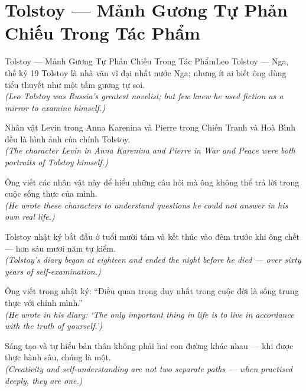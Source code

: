 \section{Tolstoy --- Mảnh Gương Tự Phản Chiếu Trong Tác Phẩm}
\begin{truyen}{Tolstoy --- Mảnh Gương Tự Phản Chiếu Trong Tác Phẩm}{Leo Tolstoy --- Nga, thế kỷ 19}
 Tolstoy là nhà văn vĩ đại nhất nước Nga; nhưng ít ai biết ông dùng tiểu thuyết như một tấm gương tự soi.\\[4pt]
\textit{(Leo Tolstoy was Russia's greatest novelist; but few knew he used fiction as a mirror to examine himself.)}

Nhân vật Levin trong Anna Karenina và Pierre trong Chiến Tranh và Hoà Bình đều là hình ảnh của chính Tolstoy.\\[4pt]
\textit{(The character Levin in Anna Karenina and Pierre in War and Peace were both portraits of Tolstoy himself.)}

Ông viết các nhân vật này để hiểu những câu hỏi mà ông không thể trả lời trong cuộc sống thực của mình.\\[4pt]
\textit{(He wrote these characters to understand questions he could not answer in his own real life.)}

Tolstoy nhật ký bắt đầu ở tuổi mười tám và kết thúc vào đêm trước khi ông chết --- hơn sáu mươi năm tự kiểm.\\[4pt]
\textit{(Tolstoy's diary began at eighteen and ended the night before he died --- over sixty years of self-examination.)}

Ông viết trong nhật ký: ``Điều quan trọng duy nhất trong cuộc đời là sống trung thực với chính mình.''\\[4pt]
\textit{(He wrote in his diary: `The only important thing in life is to live in accordance with the truth of yourself.')}

\end{truyen}
\begin{baihoc}
  Sáng tạo và tự hiểu bản thân không phải hai con đường khác nhau --- khi được thực hành sâu, chúng là một.\\[4pt]
  \textit{(Creativity and self-understanding are not two separate paths --- when practised deeply, they are one.)}
\end{baihoc}

